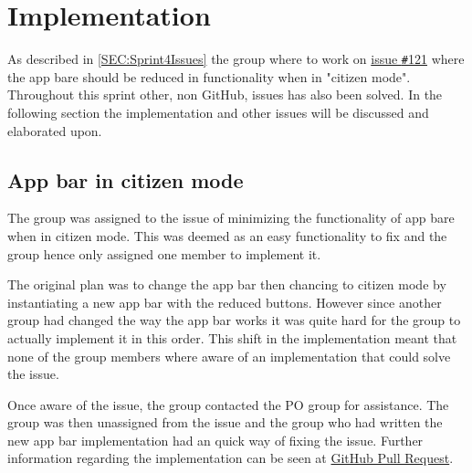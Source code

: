 \section{Implementation}
As described in \autoref{SEC:Sprint4Issues} the group where to work on \href{https://github.com/aau-giraf/weekplanner/issues/121}{issue \texttt{\#}121} where the app bare should be reduced in functionality when in "citizen mode". 
Throughout this sprint other, non GitHub, issues has also been solved.
In the following section the implementation and other issues will be discussed and elaborated upon.

\subsection{App bar in citizen mode}
The group was assigned to the issue of minimizing the functionality of app bare when in citizen mode. 
This was deemed as an easy functionality to fix and the group hence only assigned one member to implement it. 

The original plan was to change the app bar then chancing to citizen mode by instantiating a new app bar with the reduced buttons. 
However since another group had changed the way the app bar works it was quite hard for the group to actually implement it in this order.
This shift in the implementation meant that none of the group members where aware of an implementation that could solve the issue. 

Once aware of the issue, the group contacted the PO group for assistance. 
The group was then unassigned from the issue and the group who had written the new app bar implementation had an quick way of fixing the issue. 
Further information regarding the implementation can be seen at \href{https://github.com/aau-giraf/weekplanner/pull/262}{GitHub Pull Request}.



